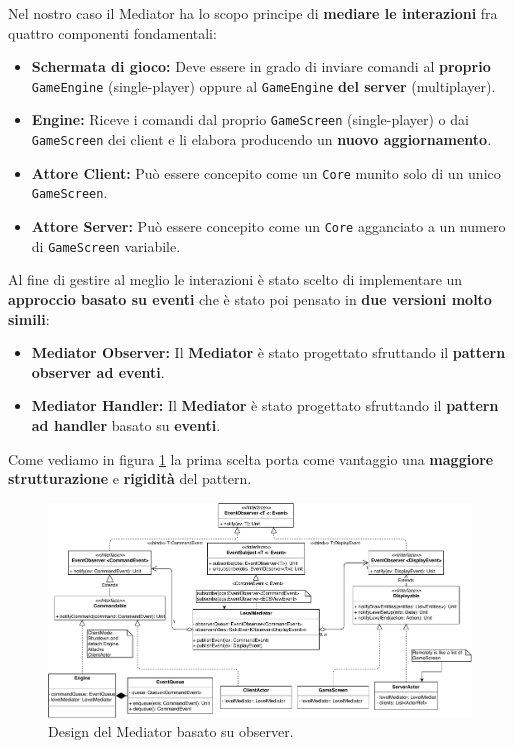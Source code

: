 Nel nostro caso il Mediator ha lo scopo principe di \textbf{mediare le interazioni} fra quattro componenti fondamentali:
\begin{itemize}
	\item{\textbf{Schermata di gioco:}}
	Deve essere in grado di inviare comandi al \textbf{proprio}  \texttt{GameEngine} (single-player) oppure al \texttt{GameEngine} \textbf{del server} (multiplayer). 
	\item{\textbf{Engine:}}
	Riceve i comandi dal proprio \texttt{GameScreen} (single-player) o dai \texttt{GameScreen} dei client e li elabora producendo un \textbf{nuovo aggiornamento}. 
	\item{\textbf{Attore Client:}}
	Può essere concepito come un \texttt{Core} munito solo di un unico \texttt{GameScreen}.
	\item{\textbf{Attore Server:}}
	Può essere concepito come un \texttt{Core} agganciato a un numero di \texttt{GameScreen} variabile.
\end{itemize}
Al fine di gestire al meglio le interazioni è stato scelto di implementare un \textbf{approccio basato su eventi} che è stato poi pensato in \textbf{due versioni molto simili}:
\begin{itemize}
	\item{\textbf{Mediator Observer:}}
	Il \textbf{Mediator} è stato progettato sfruttando il \textbf{pattern observer ad eventi}.
	\item{\textbf{Mediator Handler:}}
	Il \textbf{Mediator} è stato progettato sfruttando il \textbf{pattern ad handler} basato su \textbf{eventi}.
\end{itemize}

Come vediamo in figura \ref{fig:mediatorObserver} la prima scelta porta come vantaggio una \textbf{maggiore strutturazione} e \textbf{rigidità} del pattern.

\begin{figure}[H]
	\centering
	\includegraphics[width=0.99\columnwidth]{drawio/mediator/mediatorObserver.pdf}
	\caption{Design del Mediator basato su observer.}
	\label{fig:mediatorObserver}
\end{figure}

